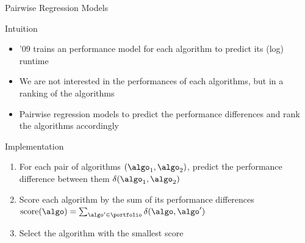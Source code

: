\begin{frame}[c]{Pairwise Regression Models}

\begin{block}{Intuition}
\begin{itemize}
  \item \satzilla{}'09 trains an performance model for each algorithm to predict its (log) runtime
  \pause
  \item We are not interested in the performances of each algorithms, but in a ranking of the algorithms
  \item Pairwise regression models  to predict the performance differences and rank the algorithms accordingly
\end{itemize}
\end{block}

\pause

\begin{block}{Implementation}
  \begin{enumerate}
    \item For each pair of algorithms $(\algo_1, \algo_2)$, predict the performance difference between them $\delta(\algo_1, \algo_2)$ 
    \item Score each algorithm by the sum of its performance differences $\text{score}(\algo) = \sum_{\algo' \in \portfolio} \delta(\algo, \algo')$
    \item Select the algorithm with the smallest score
  \end{enumerate}
\end{block}

\end{frame}
